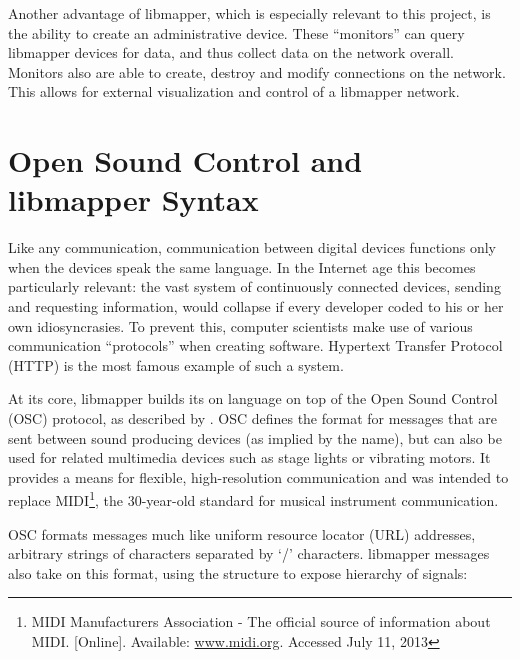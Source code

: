Another advantage of libmapper, which is especially relevant to this project, is the ability to create an administrative device. These ``monitors'' can query libmapper devices for data, and thus collect data on the network overall. Monitors also are able to create, destroy and modify connections on the network. This allows for external visualization and control of a libmapper network.

	\section{Open Sound Control and libmapper Syntax} %
	\label{sec:open_sound_control_and_libmapper_syntax}

Like any communication, communication between digital devices functions only when the devices speak the same language. In the Internet age this becomes particularly relevant: the vast system of continuously connected devices, sending and requesting information, would collapse if every developer coded to his or her own idiosyncrasies. To prevent this, computer scientists make use of various communication ``protocols'' when creating software. Hypertext Transfer Protocol (HTTP) is the most famous example of such a system.

At its core, libmapper builds its on language on top of the Open Sound Control (OSC) protocol, as described by . OSC defines the format for messages that are sent between sound producing devices (as implied by the name), but can also be used for related multimedia devices such as stage lights or vibrating motors. It provides a means for flexible, high-resolution communication and was intended to replace MIDI\footnote{MIDI Manufacturers Association - The official source of information about MIDI. [Online]. Available: \url{www.midi.org}. Accessed July 11, 2013}, the 30-year-old standard for musical instrument communication. 

OSC formats messages much like uniform resource locator (URL) addresses, arbitrary strings of characters separated by `/' characters. libmapper messages also take on this format, using the structure to expose hierarchy of signals:

